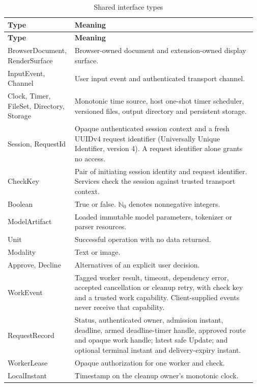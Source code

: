 \documentclass[12pt, titlepage]{article}
\newcommand{\ty}[1]{\textsf{#1}}
\newcommand{\key}{\ty{CheckKey}}
\begin{document}
\renewcommand{\arraystretch}{1.2}
\begin{longtable}{@{}p{0.25\linewidth}p{0.72\linewidth}@{}}
\caption{Shared interface types}\label{TblTypes}\\
\toprule \textbf{Type} & \textbf{Meaning} \\ \midrule
\endfirsthead
\toprule \textbf{Type} & \textbf{Meaning} \\ \midrule
\endhead
\ty{BrowserDocument}, \ty{RenderSurface} & Browser-owned document and extension-owned display surface. \\
\ty{InputEvent}, \ty{Channel} & User input event and authenticated transport channel. \\
\ty{Clock}, \ty{Timer}, \ty{FileSet}, \ty{Directory}, \ty{Storage} & Monotonic time source, host one-shot timer scheduler, versioned files, output directory and persistent storage. \\
\ty{Session}, \ty{RequestId} & Opaque authenticated session context and a fresh UUIDv4 request identifier (Universally Unique Identifier, version 4). A request identifier alone grants no access. \\
\key & Pair of initiating session identity and request identifier. Services check the session against trusted transport context. \\
\ty{Boolean} & True or false. $\mathbb{N}_0$ denotes nonnegative integers. \\
\ty{ModelArtifact} & Loaded immutable model parameters, tokenizer or parser resources. \\
\ty{Unit} & Successful operation with no data returned. \\
\ty{Modality} & Text or image. \\
\ty{Approve}, \ty{Decline} & Alternatives of an explicit user decision. \\
\ty{WorkEvent} & Tagged worker result, timeout, dependency error, accepted cancellation or cleanup retry, with check key and a trusted work capability. Client-supplied events never receive that capability. \\
\ty{RequestRecord} & Status, authenticated owner, admission instant, deadline, armed deadline-timer handle, approved route and opaque work handle; latest safe \ty{Update}; and optional terminal instant and delivery-expiry instant. \\
\ty{WorkerLease} & Opaque authorization for one worker and check. \\
\ty{LocalInstant} & Timestamp on the cleanup owner's monotonic clock. \\

\end{longtable}
\end{document}
